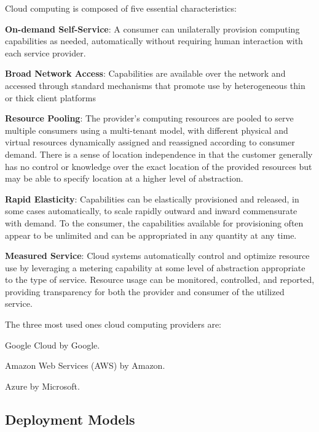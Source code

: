 Cloud computing is composed of five essential characteristics:
\bit
\item \textbf{On-demand Self-Service}: A consumer can unilaterally provision computing capabilities as needed,
automatically without requiring human interaction with each service provider.
\item \textbf{Broad Network Access}: Capabilities are available over the network and accessed through standard
mechanisms that promote use by heterogeneous thin or thick client platforms
\item \textbf{Resource Pooling}: The provider's computing resources are pooled to serve multiple consumers using a
multi-tenant model, with different physical and virtual resources dynamically assigned and reassigned according to
consumer demand. There is a sense of location independence in that the customer generally has no control or knowledge
over the exact location of the provided resources but may be able to specify location at a higher level of abstraction.
\item \textbf{Rapid Elasticity}: Capabilities can be elastically provisioned and released, in some cases automatically,
to scale rapidly outward and inward commensurate with demand. To the consumer, the capabilities available for
provisioning often appear to be unlimited and can be appropriated in any quantity at any time.
\item \textbf{Measured Service}: Cloud systems automatically control and optimize resource use by leveraging a metering
capability at some level of abstraction appropriate to the type of service. Resource usage can be monitored, controlled,
and reported, providing transparency for both the provider and consumer of the utilized service.
\eit

The three most used ones cloud computing providers are:
\bit
\item Google Cloud by Google.


\item Amazon Web Services (AWS) by Amazon.


\item Azure by Microsoft.


\eit

\subsection{Deployment Models}

